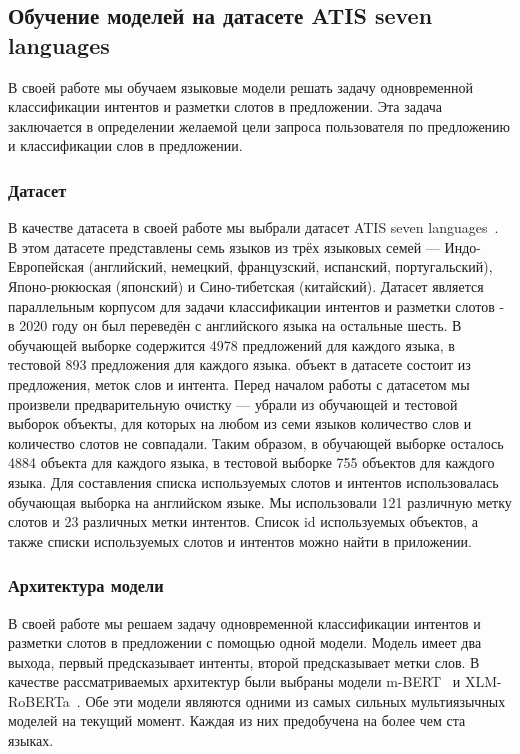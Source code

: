 \subsection{Обучение моделей на датасете ATIS seven languages}
В своей работе мы обучаем языковые модели решать задачу одновременной классификации интентов и разметки слотов в предложении.
Эта задача заключается в определении желаемой цели запроса пользователя по предложению и классификации слов в предложении.

\subsubsection{Датасет}
В качестве датасета в своей работе мы выбрали датасет ATIS seven languages~\cite{Xu2020EndtoEndSA}.
В этом датасете представлены семь языков из трёх языковых семей —
Индо-Европейская (английский, немецкий, французский, испанский, португальский), Японо-рюкюская (японский) и Сино-тибетская (китайский).
Датасет является параллельным корпусом для задачи классификации интентов и разметки слотов - в 2020 году он был переведён с английского языка на остальные шесть.
В обучающей выборке содержится 4978 предложений для каждого языка, в тестовой 893 предложения для каждого языка.
 объект в датасете состоит из предложения, меток слов и интента.
Перед началом работы с датасетом мы произвели предварительную очистку —
убрали из обучающей и тестовой выборок объекты, для которых на любом из семи языков количество слов и количество слотов не совпадали.
Таким образом, в обучающей выборке осталось 4884 объекта для каждого языка, в тестовой выборке 755 объектов для каждого языка.
Для составления списка используемых слотов и интентов использовалась обучающая выборка на английском языке.
Мы использовали 121 различную метку слотов и 23 различных метки интентов.
Список id используемых объектов, а также списки используемых слотов и интентов можно найти в приложении.

\subsubsection{Архитектура модели}
В своей работе мы решаем задачу одновременной классификации интентов и разметки слотов в предложении с помощью одной модели.
Модель имеет два выхода, первый предсказывает интенты, второй предсказывает метки слов.
В качестве рассматриваемых архитектур были выбраны модели m-BERT~\cite{devlin-etal-2019-bert} и XLM-RoBERTa~\cite{Conneau2020UnsupervisedCR}.
Обе эти модели являются одними из самых сильных мультиязычных моделей на текущий момент.
Каждая из них предобучена на более чем ста языках.

